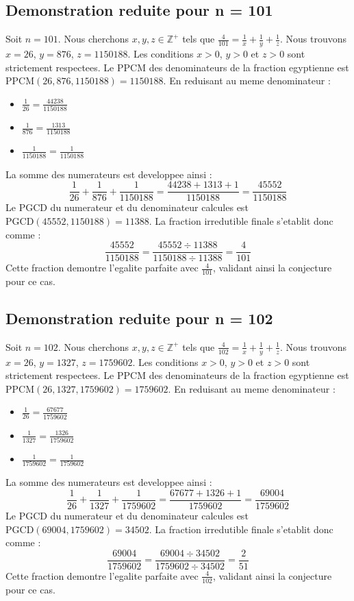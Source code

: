 \documentclass[11pt,a4paper]{article}
\begin{document}
\subsection{Demonstration reduite pour n = 101}
Soit $n = 101$. Nous cherchons $x, y, z \in \mathbb{Z}^{+}$ tels que $\frac{4}{101} = \frac{1}{x} + \frac{1}{y} + \frac{1}{z}$.
Nous trouvons $x = 26$, $y = 876$, $z = 1150188$.
Les conditions $x > 0$, $y > 0$ et $z > 0$ sont strictement respectees.
Le PPCM des denominateurs de la fraction egyptienne est $\text{PPCM}(26, 876, 1150188) = 1150188$.
En reduisant au meme denominateur :
\begin{itemize}
    \item $\frac{1}{26} = \frac{44238}{1150188}$
    \item $\frac{1}{876} = \frac{1313}{1150188}$
    \item $\frac{1}{1150188} = \frac{1}{1150188}$
\end{itemize}
La somme des numerateurs est developpee ainsi :
$$ \frac{1}{26} + \frac{1}{876} + \frac{1}{1150188} = \frac{44238 + 1313 + 1}{1150188} = \frac{45552}{1150188} $$
Le PGCD du numerateur et du denominateur calcules est $\text{PGCD}(45552, 1150188) = 11388$.
La fraction irredutible finale s'etablit donc comme :
$$ \frac{45552}{1150188} = \frac{45552 \div 11388}{1150188 \div 11388} = \frac{4}{101} $$
Cette fraction demontre l'egalite parfaite avec $\frac{4}{101}$, validant ainsi la conjecture pour ce cas.

\subsection{Demonstration reduite pour n = 102}
Soit $n = 102$. Nous cherchons $x, y, z \in \mathbb{Z}^{+}$ tels que $\frac{4}{102} = \frac{1}{x} + \frac{1}{y} + \frac{1}{z}$.
Nous trouvons $x = 26$, $y = 1327$, $z = 1759602$.
Les conditions $x > 0$, $y > 0$ et $z > 0$ sont strictement respectees.
Le PPCM des denominateurs de la fraction egyptienne est $\text{PPCM}(26, 1327, 1759602) = 1759602$.
En reduisant au meme denominateur :
\begin{itemize}
    \item $\frac{1}{26} = \frac{67677}{1759602}$
    \item $\frac{1}{1327} = \frac{1326}{1759602}$
    \item $\frac{1}{1759602} = \frac{1}{1759602}$
\end{itemize}
La somme des numerateurs est developpee ainsi :
$$ \frac{1}{26} + \frac{1}{1327} + \frac{1}{1759602} = \frac{67677 + 1326 + 1}{1759602} = \frac{69004}{1759602} $$
Le PGCD du numerateur et du denominateur calcules est $\text{PGCD}(69004, 1759602) = 34502$.
La fraction irredutible finale s'etablit donc comme :
$$ \frac{69004}{1759602} = \frac{69004 \div 34502}{1759602 \div 34502} = \frac{2}{51} $$
Cette fraction demontre l'egalite parfaite avec $\frac{4}{102}$, validant ainsi la conjecture pour ce cas.
\end{document}
